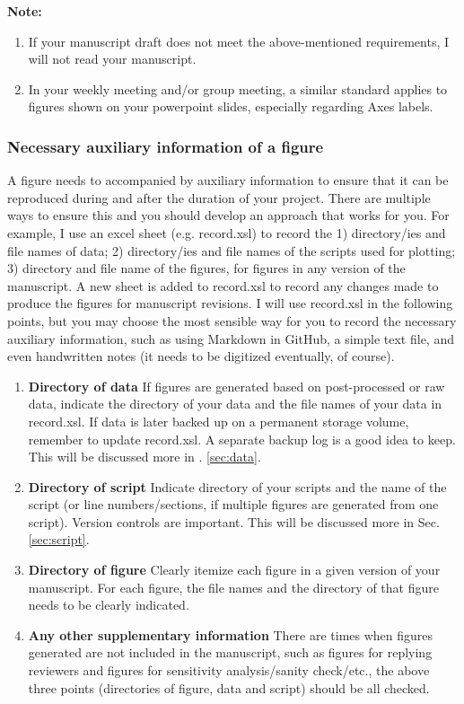 \documentclass[12pt]{article}
\begin{document}
\textbf{\LARGE{Note:}}

\begin{enumerate}
    \item \Large{If your manuscript draft does not meet the above-mentioned requirements, I will not read your manuscript.}
    \item In your weekly meeting and/or group meeting, a similar standard applies to figures shown on your powerpoint slides, especially regarding Axes labels. 
    
\end{enumerate}

\subsubsection{Necessary auxiliary information of a figure}
A figure needs to accompanied by auxiliary information to ensure that it can be reproduced during and after the duration of your project. There are multiple ways to ensure this and you should develop an approach that works for you. For example, I use an excel sheet (e.g. record.xsl) to record the 1) directory/ies and file names of data; 2) directory/ies and file names of the scripts used for plotting; 3) directory and file name of the figures, for figures in any version of the manuscript. A new sheet is added to record.xsl to record any changes made to produce the figures for manuscript revisions. I will use record.xsl in the following points, but you may choose the most sensible way for you to record the necessary auxiliary information, such as using Markdown in GitHub, a simple text file, and even handwritten notes (it needs to be digitized eventually, of course). 

\begin{enumerate}
    
    \item \textbf{Directory of data} If figures are generated based on post-processed or raw data, indicate the directory of your data and the file names of your data in record.xsl. If data is later backed up on a permanent storage volume, remember to update record.xsl. A separate backup log is a good idea to keep. This will be discussed more in \Sec. \ref{sec:data}.
    \item \textbf{Directory of script} Indicate directory of your scripts and the name of the script (or line numbers/sections, if multiple figures are generated from one script). Version controls are important. This will be discussed more in Sec.\ref{sec:script}.
    \item \textbf{Directory of figure} Clearly itemize each figure in a given version of your manuscript. For each figure, the file names and the directory of that figure needs to be clearly indicated.
    \item \textbf{Any other supplementary information} There are times when figures generated are not included in the manuscript, such as figures for replying reviewers and figures for sensitivity analysis/sanity check/etc., the above three points (directories of figure, data and script) should be all checked.
    
\end{enumerate}
\end{document}
